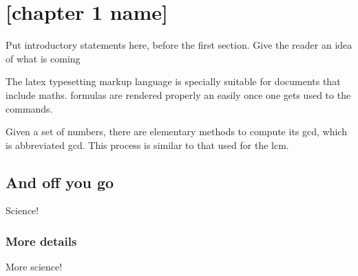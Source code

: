 \chapter{[chapter 1 name]} \label{ch:[chapter 1 label]}

Put introductory statements here, before the first section.
Give the reader an idea of what is coming

The \Gls{latex} typesetting markup language is specially suitable for documents that include \gls{maths}. \Glspl{formula} are rendered properly an easily once one gets used to the commands.

Given a set of numbers, there are elementary methods to compute its \acrlong{gcd}, which is abbreviated \acrshort{gcd}. This process is similar to that used for the \acrfull{lcm}.

\section{And off you go}

Science!

\subsection{More details}

More science!
